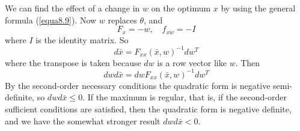 We can find the effect of a change in $w$ on the optimum $x$ by using the general formula (\ref{equa8.9}). Now $w$ replaces $\theta$, and
\begin{equation*}   
   F_x = -w, \quad f_{xw} = -I
\end{equation*}
where $I$ is the identity matrix. So
\begin{equation*}   
   d \bar{x} = F_{xx} ( \bar{x}, w )^{-1} d w^T
\end{equation*}
where the transpose is taken because $dw$ is a row vector like $w$. Then
\begin{equation*}   
   dw d \bar{x} = dw F_{xx} ( \bar{x}, w )^{-1} d w^T
\end{equation*}
By the second-order necessary conditions the quadratic form is negative semi-definite, so $dw d\bar{x} \leq 0$. If the maximum is regular, that is, if the second-order sufficient conditions are satisfied, then the quadratic form is negative definite, and we have the somewhat stronger result $dw d\bar{x} < 0$.

